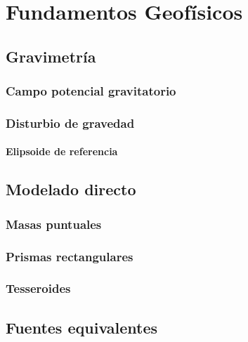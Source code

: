 \part{Fundamentos Geofísicos}

\chapter{Gravimetría}

\section{Campo potencial gravitatorio}

\section{Disturbio de gravedad}

\subsection{Elipsoide de referencia}

\chapter{Modelado directo}

\section{Masas puntuales}

\section{Prismas rectangulares}

\section{Tesseroides}

\chapter{Fuentes equivalentes}
